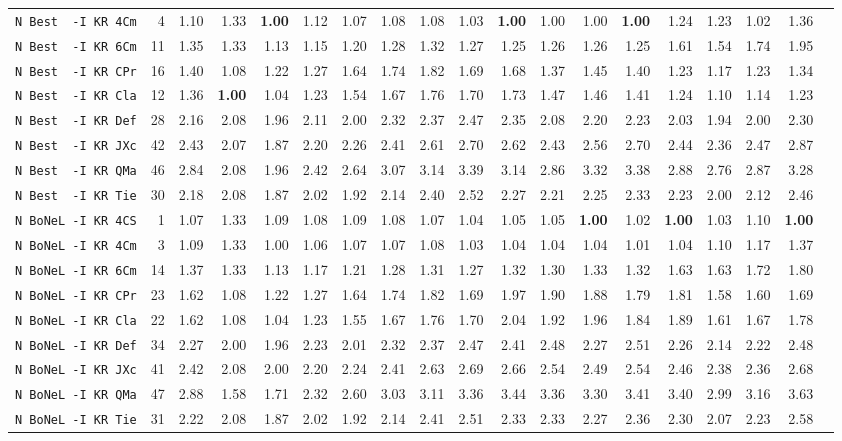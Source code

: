 \begin{tabular}{l | r @{~~} r | r@{~~}r@{~~}r@{~~}r@{~~}r@{~~}r@{~~}r@{~~}r@{~~}r@{~~}r@{~~}r@{~~}r@{~~}r@{~~}r@{~~}r@{~~}r|}
\verb+N Best  -I KR 4Cm+ & 4 & 1.10 & 1.33&\textbf{1.00}&1.12&1.07&1.08&1.08&1.03&\textbf{1.00}&1.00&1.00&\textbf{1.00}&1.24&1.23&1.02&1.36\\
\verb+N Best  -I KR 6Cm+ & 11 & 1.35 & 1.33&1.13&1.15&1.20&1.28&1.32&1.27&1.25&1.26&1.26&1.25&1.61&1.54&1.74&1.95\\
\verb+N Best  -I KR CPr+ & 16 & 1.40 & 1.08&1.22&1.27&1.64&1.74&1.82&1.69&1.68&1.37&1.45&1.40&1.23&1.17&1.23&1.34\\
\verb+N Best  -I KR Cla+ & 12 & 1.36 & \textbf{1.00}&1.04&1.23&1.54&1.67&1.76&1.70&1.73&1.47&1.46&1.41&1.24&1.10&1.14&1.23\\
\verb+N Best  -I KR Def+ & 28 & 2.16 & 2.08&1.96&2.11&2.00&2.32&2.37&2.47&2.35&2.08&2.20&2.23&2.03&1.94&2.00&2.30\\
\verb+N Best  -I KR JXc+ & 42 & 2.43 & 2.07&1.87&2.20&2.26&2.41&2.61&2.70&2.62&2.43&2.56&2.70&2.44&2.36&2.47&2.87\\
\verb+N Best  -I KR QMa+ & 46 & 2.84 & 2.08&1.96&2.42&2.64&3.07&3.14&3.39&3.14&2.86&3.32&3.38&2.88&2.76&2.87&3.28\\
\verb+N Best  -I KR Tie+ & 30 & 2.18 & 2.08&1.87&2.02&1.92&2.14&2.40&2.52&2.27&2.21&2.25&2.33&2.23&2.00&2.12&2.46\\
\verb+N BoNeL -I KR 4CS+ & 1 & 1.07 & 1.33&1.09&1.08&1.09&1.08&1.07&1.04&1.05&1.05&\textbf{1.00}&1.02&\textbf{1.00}&1.03&1.10&\textbf{1.00}\\
\verb+N BoNeL -I KR 4Cm+ & 3 & 1.09 & 1.33&1.00&1.06&1.07&1.07&1.08&1.03&1.04&1.04&1.04&1.01&1.04&1.10&1.17&1.37\\
\verb+N BoNeL -I KR 6Cm+ & 14 & 1.37 & 1.33&1.13&1.17&1.21&1.28&1.31&1.27&1.32&1.30&1.33&1.32&1.63&1.63&1.72&1.80\\
\verb+N BoNeL -I KR CPr+ & 23 & 1.62 & 1.08&1.22&1.27&1.64&1.74&1.82&1.69&1.97&1.90&1.88&1.79&1.81&1.58&1.60&1.69\\
\verb+N BoNeL -I KR Cla+ & 22 & 1.62 & 1.08&1.04&1.23&1.55&1.67&1.76&1.70&2.04&1.92&1.96&1.84&1.89&1.61&1.67&1.78\\
\verb+N BoNeL -I KR Def+ & 34 & 2.27 & 2.00&1.96&2.23&2.01&2.32&2.37&2.47&2.41&2.48&2.27&2.51&2.26&2.14&2.22&2.48\\
\verb+N BoNeL -I KR JXc+ & 41 & 2.42 & 2.08&2.00&2.20&2.24&2.41&2.63&2.69&2.66&2.54&2.49&2.54&2.46&2.38&2.36&2.68\\
\verb+N BoNeL -I KR QMa+ & 47 & 2.88 & 1.58&1.71&2.32&2.60&3.03&3.11&3.36&3.44&3.36&3.30&3.41&3.40&2.99&3.16&3.63\\
\verb+N BoNeL -I KR Tie+ & 31 & 2.22 & 2.08&1.87&2.02&1.92&2.14&2.41&2.51&2.33&2.33&2.27&2.36&2.30&2.07&2.23&2.58\\

\end{tabular}
